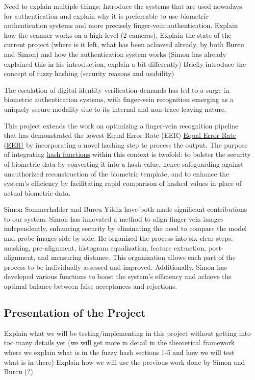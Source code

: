 Need to explain multiple things:
    Introduce the systems that are used nowadays for authentication and explain why it is preferrable to use biometric authentication systems and more precisely finger-vein authentication. Explain how the scanner works on a high level (2 cameras).
    Explain the state of the current project (where is it left, what has been achieved already, by both Burcu and Simon) and how the authentication system works (Simon has already explained this in his introduction, explain a bit differently)
    Briefly introduce the concept of fuzzy hashing (security reasons and usability)


The escalation of digital identity verification demands has led to a surge in biometric authentication systems, with finger-vein recognition emerging as a uniquely secure modality due to its internal and non-trace-leaving nature. 

This project extends the work on optimizing a finger-vein recognition pipeline that has demonstrated the lowest Equal Error Rate (EER) \hyperref[def:EER]{Equal Error Rate (EER)} by incorporating a novel hashing step to process the output. The purpose of integrating \hyperref[def:Hash_Function]{hash functions} within this context is twofold: to bolster the security of biometric data by converting it into a hash value, hence safeguarding against unauthorized reconstruction of the biometric template, and to enhance the system's efficiency by facilitating rapid comparison of hashed values in place of actual biometric data.


Simon Sommerhalder and Burcu Yildiz have both made significant contributions to our system. Simon has innovated a method to align finger-vein images independently, enhancing security by eliminating the need to compare the model and probe images side by side. He organized the process into six clear steps: masking, pre-alignment, histogram equalization, feature extraction, post-alignment, and measuring distance. This organization allows each part of the process to be individually assessed and improved. Additionally, Simon has developed various functions to boost the system's efficiency and achieve the optimal balance between false acceptances and rejections. 


\subsection{Presentation of the Project}
Explain what we will be testing/implementing in this project without getting into too many details yet (we will get more in detail in the theoretical framework where we explain what is in the fuzzy hash sections 1-5 and how we will test what is in there)
Explain how we will use the previous work done by Simon and Burcu (?) 

